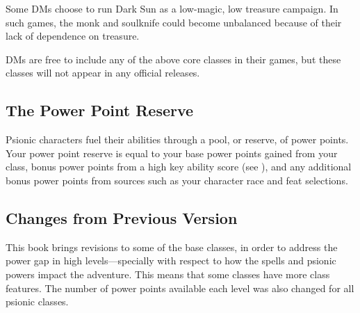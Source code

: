 Some DMs choose to run {\tableheader Dark Sun} as a low-magic, low treasure campaign. In such games, the monk and soulknife could become unbalanced because of their lack of dependence on treasure.

DMs are free to include any of the above core classes in their games, but these classes will not appear in any official releases.


\subsection{The Power Point Reserve}
Psionic characters fuel their abilities through a pool, or reserve, of power points. Your power point reserve is equal to your base power points gained from your class, bonus power points from a high key ability score (see ), and any additional bonus power points from sources such as your character race and feat selections.

\subsection{Changes from Previous Version}
This book brings revisions to some of the base classes, in order to address the power gap in high levels---specially with respect to how the spells and psionic powers impact the adventure. This means that some classes have more class features. The number of power points available each level was also changed for all psionic classes.

